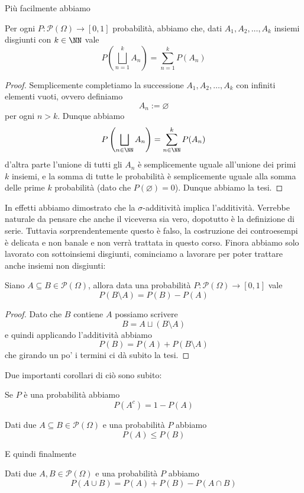 \documentclass[11pt]{scrartcl}
\newcommand{\parti}[1]{\mathcal{P}\!\left(#1\right)}
\newcommand{\eset}{\varnothing}
\begin{document}
	Più facilmente abbiamo
	\begin{proposition}
		Per ogni $P:\parti{\Omega}\to [0,1]$ probabilità, abbiamo che, dati $A_1,A_2,\dots,A_k$ insiemi disgiunti con $k\in\NN$ vale
		$$P\left(\bigsqcup_{n=1}^kA_n\right)=\sum_{n=1}^kP(A_n)$$
	\end{proposition}
	\begin{proof}
		Semplicemente completiamo la successione $A_1,A_2,\dots,A_k$ con infiniti elementi vuoti, ovvero definiamo 
		$$A_n:=\eset$$
		per ogni $n>k$. Dunque abbiamo
		$$P\left(\bigsqcup_{n\in\NN}A_n\right)=\sum_{n\in\NN}^kP(A_n)$$
		d'altra parte l'unione di tutti gli $A_n$ è semplicemente uguale all'unione dei primi $k$ insiemi, e la somma di tutte le probabilità è semplicemente uguale alla somma delle prime $k$ probabilità (dato che $P(\eset)=0$). Dunque abbiamo la tesi.
	\end{proof}
	In effetti abbiamo dimostrato che la $\sigma$-additività implica l'additività. Verrebbe naturale da pensare che anche il viceversa sia vero, dopotutto è la definizione di serie. Tuttavia sorprendentemente questo è falso, la costruzione dei controesempi è delicata e non banale e non verrà trattata in questo corso. Finora abbiamo solo lavorato con sottoinsiemi disgiunti, cominciamo a lavorare per poter trattare anche insiemi non disgiunti:
	\begin{proposition}
		Siano $A\subseteq B\in\parti{\Omega}$, allora data una probabilità $P:\parti{\Omega}\to[0,1]$ vale
		$$P(B\setminus A)=P(B)-P(A)$$
	\end{proposition}
	\begin{proof}
		Dato che $B$ contiene $A$ possiamo scrivere 
		$$B=A\sqcup (B\setminus A)$$
		e quindi applicando l'additività abbiamo
		$$P(B)=P(A)+P(B\setminus A)$$
		che girando un po' i termini ci dà subito la tesi.
	\end{proof}
	Due importanti corollari di ciò sono subito:
	\begin{corollary}
		Se $P$ è una probabilità abbiamo
		$$P\left(A^c\right)=1-P(A)$$
	\end{corollary}
	\begin{corollary}
		Dati due $A\subseteq B\in \parti{\Omega}$ e una probabilità $P$ abbiamo
		$$P(A)\le P(B)$$ 
	\end{corollary}
	E quindi finalmente
	\begin{proposition}
		Dati due $A,B\in \parti{\Omega}$ e una probabilità $P$ abbiamo
		$$P(A\cup B)=P(A)+P(B)-P(A\cap B)$$
	\end{proposition}
\end{document}
